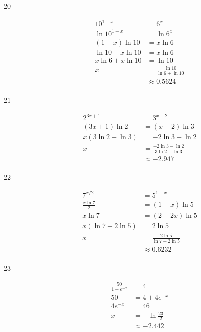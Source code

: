 \documentclass{exam}
\begin{document}
\begin{description}
      \item[20]
        \begin{align*}
          10^{1 - x}         &= 6^x \\
          \ln 10^{1 - x}     &= \ln 6^x \\
          (1 - x) \ln 10     &= x \ln 6 \\
          \ln 10 - x \ln 10  &= x \ln 6 \\
          x \ln 6 + x \ln 10 &= \ln 10 \\
          x                  &= \frac{\ln 10}{\ln 6 + \ln 10} \\
                             &\approx \boxed{0.5624} \\
        \end{align*}

      \item[21]
        \begin{align*}
          2^{3x + 1}          &= 3^{x - 2} \\
          (3x + 1) \ln 2      &= (x - 2) \ln 3 \\
          x (3 \ln 2 - \ln 3) &= - 2 \ln 3 - \ln 2 \\
          x                   &= \frac{ - 2 \ln 3 - \ln 2}{3 \ln 2 - \ln 3} \\
                              &\approx \boxed{-2.947} \\
        \end{align*}

      \item[22]
        \begin{align*}
          7^{x/2}             &= 5^{1 - x} \\
          \frac{x \ln 7}{2}   &= (1 - x) \ln 5 \\
          x \ln 7             &= (2 - 2x) \ln 5 \\
          x (\ln 7 + 2 \ln 5) &= 2 \ln 5 \\
          x                   &= \frac{2 \ln 5}{\ln 7 + 2 \ln 5} \\
                              &\approx \boxed{0.6232} \\
        \end{align*}

      \item[23]
        \begin{align*}
          \frac{50}{1 + e^{-x}} & = 4 \\
          50                    & = 4 + 4e^{-x} \\
          4e^{-x}               & = 46 \\
          x                     & = -\ln \frac{23}{2} \\
                                & \approx \boxed{ -2.442 } \\
        \end{align*}


\end{description}
\end{document}
